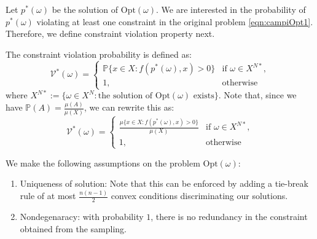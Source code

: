 \documentclass[letterpaper, 10 pt, conference]{ieeeconf}  %
\newcommand{\Opt}{\text{Opt} }
\newcommand{\calV}{\mathcal{V}}
\newenvironment{definition}[1][Definition]{\begin{trivlist}
\item[\hskip \labelsep {\bfseries #1}]}{\end{trivlist}}
\begin{document}
Let $p^*(\omega)$ be the solution of $\Opt(\omega)$. We are interested in the probability of $p^*(\omega)$ violating at least one constraint in the original problem \eqref{eqn:campiOpt1}. Therefore, we define constraint violation property next.

\begin{definition}[Constraint violation probability \cite{campi}] The constraint violation probability is defined as:
\begin{equation*}
\calV^*(\omega)=
    \begin{cases}
      \mathbb{P}\{x \in X: f(p^*(\omega), x) > 0\} &\text{if}\,\, \omega \in X^{N*},\\
      1, & \text{otherwise}
    \end{cases}
\end{equation*}
where $X^{N*}:=\{\omega \in X^N: \text{the solution of $\Opt(\omega)$ exists}\}$. 
Note that, since we have $\mathbb{P}(A) = \frac{\mu(A)}{\mu(X)}$, we can rewrite this as:
\begin{equation*}
\calV^*(\omega)=
    \begin{cases}
      \frac{\mu\{x \in X: f(p^*(\omega), x) > 0\}}{\mu(X)} &\text{if}\,\, \omega \in X^{N*},\\
      1, & \text{otherwise}
    \end{cases}
\end{equation*}
\end{definition}

We make the following assumptions on the problem $\Opt(\omega)$:
\begin{enumerate}
\item \label{assumption1} Uniqueness of solution: Note that this can be enforced by adding a tie-break rule of at most $\frac{n(n-1)}{2}$ convex conditions discriminating our solutions. 
\item \label{assumption2} Nondegenaracy: with probability $1$, there is no redundancy in the constraint obtained from the sampling. 
\end{enumerate}
\end{document}
